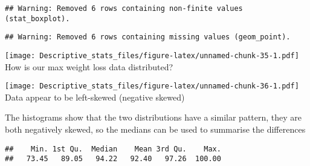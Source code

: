\documentclass[
]{article}
\newenvironment{Shaded}{\begin{snugshade}}{\end{snugshade}}
\newcommand{\FunctionTok}[1]{\textcolor[rgb]{0.00,0.00,0.00}{#1}}
\newcommand{\NormalTok}[1]{#1}
\newcommand{\OtherTok}[1]{\textcolor[rgb]{0.56,0.35,0.01}{#1}}
\newcommand{\SpecialCharTok}[1]{\textcolor[rgb]{0.00,0.00,0.00}{#1}}
\newcommand{\StringTok}[1]{\textcolor[rgb]{0.31,0.60,0.02}{#1}}
\begin{document}
\begin{verbatim}
## Warning: Removed 6 rows containing non-finite values (stat_boxplot).
\end{verbatim}

\begin{verbatim}
## Warning: Removed 6 rows containing missing values (geom_point).
\end{verbatim}

\texttt{[image: Descriptive\_stats\_files/figure-latex/unnamed-chunk-35-1.pdf]}
How is our max weight loss data distributed?

\begin{Shaded}
\end{Shaded}

\texttt{[image: Descriptive\_stats\_files/figure-latex/unnamed-chunk-36-1.pdf]}
Data appear to be left-skewed (negative skewed)

The histograms show that the two distributions have a similar pattern,
they are both negatively skewed, so the medians can be used to summarise
the differences

\begin{Shaded}
\end{Shaded}

\begin{verbatim}
##    Min. 1st Qu.  Median    Mean 3rd Qu.    Max. 
##   73.45   89.05   94.22   92.40   97.26  100.00
\end{verbatim}

\begin{Shaded}
\end{Shaded}
\end{document}
